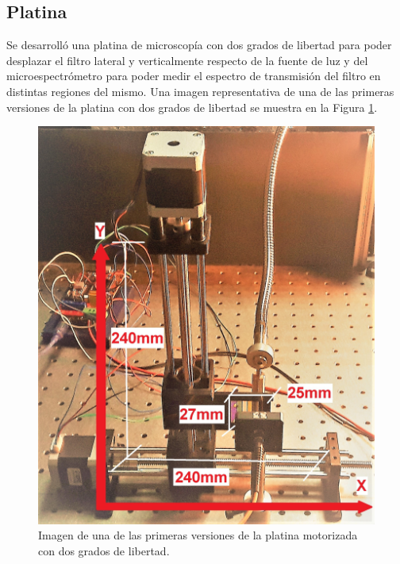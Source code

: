 
\singlespacing
\subsection{Platina \href{https://github.com/jrr1984/open\_frame\_XYStage}{\faGithub} \href{https://github.com/jrr1984/open_frame_XYStage/tree/master/3dprintedparts/STLs}{\faCubes}}
\label{sec:platina}

\hspace{0.5cm}Se desarrolló una platina de microscopía con dos grados de libertad para poder desplazar el filtro lateral y verticalmente respecto de la fuente de luz y del microespectrómetro para poder medir el espectro de transmisión del filtro en distintas regiones del mismo. Una imagen representativa de una de las primeras versiones de la platina con dos grados de libertad se muestra en la Figura \ref{fig:plato0}.


\begin{figure}[H]
	\centering
	\includegraphics[scale=0.15]{Figs/microespectrometro/stageearly.jpg}
	\caption{Imagen de una de las primeras versiones de la platina motorizada con dos grados de libertad.}
	\label{fig:plato0}
\end{figure}


